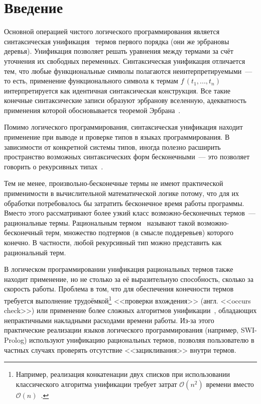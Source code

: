 \section{Введение}

Основной операцией чистого логического программирования является синтаксическая унификация~\cite{robinson1965machine} термов первого порядка (они же эрбрановы деревья). Унификация позволяет решать уравнения между термами за счёт уточнения их свободных переменных. Синтаксическая унификация отличается тем, что любые функциональные символы полагаются неинтерпретируемыми~--- то есть, применение функционального символа к термам $f\,(t_1, ..., t_n)$ интерпретируется как идентичная синтаксическая конструкция. Все такие конечные синтаксические записи образуют эрбранову вселенную, адекватность применения которой обосновывается теоремой Эрбрана~\cite{herbrand1930}.

Помимо логического программирования, синтаксическая унификация находит применение при выводе и проверке типов в языках программирования. В зависимости от конкретной системы типов, иногда полезно расширить пространство возможных синтаксических форм бесконечными~--- это позволяет говорить о рекурсивных типах~\cite{pierce2002types}.

Тем не менее, произвольно-бесконечные термы не имеют практической применимости в вычислительной математической логике потому, что для их обработки потребовалось бы затратить бесконечное время работы программы. Вместо этого рассматривают более узкий класс возможно-бесконечных термов~--- рациональные термы. Рациональным термом~\cite{colmerauer1982prolog} называют такой возможно-бесконечный терм, множество подтермов (в смысле поддеревьев) которого конечно. В частности, любой рекурсивный тип можно представить как рациональный терм.

В логическом программировании унификация рациональных термов также находит применение, но не столько за её выразительную способность, сколько за скорость работы. Проблема в том, что для обеспечения конечности термов требуется выполнение трудоёмкой\footnote{Например, реализация конкатенации двух списков при использовании классического алгоритма унификации требует затрат $\mathcal{O}(n^2)$ времени вместо $\mathcal{O}(n)$~\cite{colmerauer1982prolog}.} <<проверки вхождения>> (англ. <<occurs check>>) или применение более сложных алгоритмов унификации~\cite{martelli1982efficient}, обладающих непрактичными накладными расходами времени работы. Из-за этого практические реализации языков логического программирования (например, SWI-Prolog) используют унификацию рациональных термов, позволяя пользователю в частных случаях проверять отсутствие <<зацикливания>> внутри термов.

